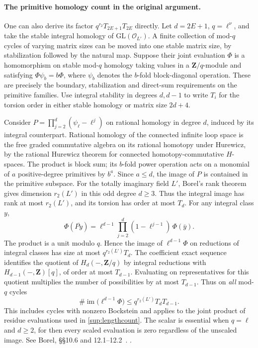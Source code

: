 \paragraph{The primitive homology count in the original argument.}
One can also derive its factor \(q^{r_2}T_{2E+1}T_{2E}\) directly.
Let \(d=2E+1\), \(q=\ell^\nu\), and take the stable integral homology of
\(\mathrm{GL}(\mathcal O_{L'})\). A finite collection of mod-\(q\)
cycles of varying matrix sizes can be moved into one stable matrix
size, by stabilization followed by the natural map. Suppose their
joint evaluation \(\Phi\) is a homomorphism on stable mod-\(q\)
homology taking values in a \(\mathbf Z/q\)-module and satisfying
\(\Phi\psi_b=b\Phi\), where \(\psi_b\) denotes the \(b\)-fold
block-diagonal operation. These are precisely the boundary,
stabilization and direct-sum requirements on the primitive families.
Use integral stability in degrees \(d,d-1\) to write \(T_i\) for the
torsion order in either stable homology or matrix size \(2d+4\).

Consider \(P=\prod_{j=2}^{d}(\psi_\ell-\ell^j)\) on rational
homology in degree \(d\), induced by its integral counterpart. Rational
homology of the connected infinite loop space is the free graded
commutative algebra on its rational homotopy under Hurewicz, by the
rational Hurewicz theorem for connected homotopy-commutative
\(H\)-spaces. The product is block sum; its \(b\)-fold power operation
acts on a monomial of \(a\) positive-degree primitives by \(b^a\).
Since \(a\le d\), the image of \(P\) is contained in the primitive
subspace. For the totally imaginary field \(L'\), Borel's rank theorem
gives dimension \(r_2(L')\) in this odd degree \(d\ge3\).
Thus the integral image has rank at most \(r_2(L')\), and its torsion
has order at most \(T_d\). For any integral class \(y\),
\[
 \Phi(\overline{Py})=
 \ell^{d-1}\prod_{j=2}^{d}(1-\ell^{j-1})\,\Phi(\bar y).
\]
The product is a unit modulo \(q\). Hence the image of
\(\ell^{d-1}\Phi\) on reductions of integral classes has size at most
\(q^{r_2(L')}T_d\). The coefficient exact sequence identifies the
quotient of \(H_d(-,\mathbf Z/q)\) by integral reductions with
\(H_{d-1}(-,\mathbf Z)[q]\), of order at most \(T_{d-1}\).
Evaluating on representatives for this quotient multiplies the number
of possibilities by at most \(T_{d-1}\). Thus on \emph{all} mod-\(q\) cycles
\[
 \#\operatorname{im}\bigl(\ell^{d-1}\Phi\bigr)
 \le q^{r_2(L')}T_dT_{d-1}.
\]
This includes cycles with nonzero Bockstein and applies to the joint
product of residue evaluations used in \eqref{sup:lengthcount}. The
scalar is essential when \(q=\ell\) and \(d\ge2\), for then every
scaled evaluation is zero regardless of the unscaled image.
See Borel, \S\S10.6 and 12.1--12.2~\cite{borelStable}.
.

